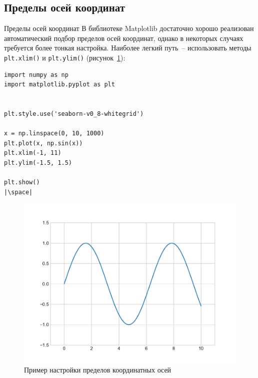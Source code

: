 \documentclass[aspectratio=169, mathserif]{beamer}	%
\begin{document}
\subsection{Пределы осей координат}
\begin{frame}[fragile, label=m]{Пределы осей координат}
\scriptsize
В библиотеке Matplotlib достаточно хорошо реализован автоматический подбор пределов осей координат, однако в некоторых случаях требуется более тонкая настройка. Наиболее легкий путь~-- использовать методы \texttt{plt.xlim()} и \texttt{plt.ylim()} (рисунок~\ref{fig:fig_8}):
\vfill
\begin{minipage}{.4\textwidth}
\begin{verbatim}
import numpy as np
import matplotlib.pyplot as plt


plt.style.use('seaborn-v0_8-whitegrid')

x = np.linspace(0, 10, 1000)
plt.plot(x, np.sin(x))
plt.xlim(-1, 11)
plt.ylim(-1.5, 1.5)

plt.show()
|\space|
\end{verbatim}
\end{minipage}
\begin{minipage}{.59\textwidth}
\begin{figure}[h!]
	\centering
	\includegraphics[width=.85\linewidth]{./pics/Figure_8}
	\caption{Пример настройки пределов координатных осей}
	\label{fig:fig_8}
\end{figure}
\end{minipage}
\vfill
\end{frame}
\end{document}
